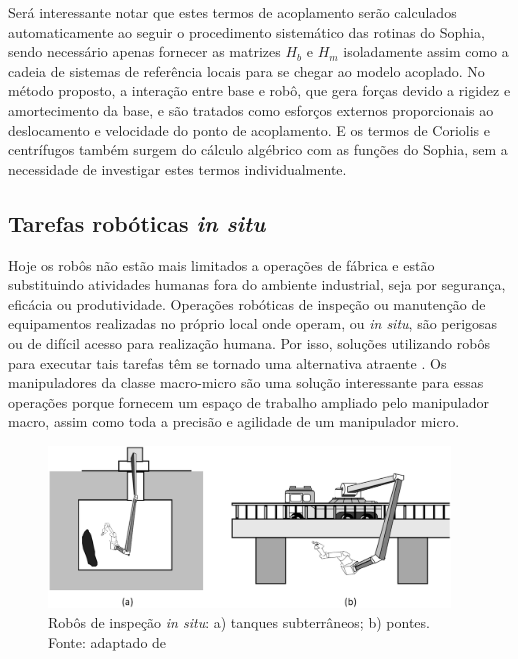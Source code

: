 Será interessante notar que estes termos de acoplamento serão calculados
automaticamente ao seguir o procedimento sistemático das rotinas do Sophia,
sendo necessário apenas fornecer as matrizes $H_b$ e $H_m$ isoladamente assim
como a cadeia de sistemas de referência locais para se chegar ao modelo
acoplado. No método proposto, a interação entre base e robô, que gera forças devido a
rigidez e amortecimento da base, e são tratados como esforços externos
proporcionais ao deslocamento e velocidade do ponto de acoplamento. E os termos
de Coriolis e centrífugos também surgem do cálculo algébrico com as
funções do Sophia, sem a necessidade de investigar estes termos individualmente. 



\subsection{Tarefas robóticas \textit{in situ}} \label{sec::insitu}

Hoje os robôs não estão mais limitados a operações de fábrica e estão
substituindo atividades humanas fora do ambiente industrial, seja por segurança,
eficácia ou produtividade. Operações robóticas de inspeção ou manutenção de
equipamentos realizadas no próprio local onde operam, ou \textit{in situ}, são
perigosas ou de difícil acesso para realização humana. Por isso, soluções
utilizando robôs para executar tais tarefas têm se tornado uma alternativa
atraente . Os manipuladores da classe macro-micro são uma solução interessante
para essas operações porque fornecem um espaço de trabalho ampliado pelo
manipulador macro, assim como toda a precisão e agilidade de um manipulador
micro.

\begin{figure}[h]
	\centering 
 	\includegraphics[width=0.95\textwidth]{figs/inspection_robots}
 	\caption[Robôs de inspeção \textit{in situ}]{Robôs de inspeção \textit{in
 	situ}: a) tanques subterrâneos; b) pontes. \\ Fonte: adaptado de \cite{mavroidis1995end}}
 	\label{fig::inspection_robots}
\end{figure}

